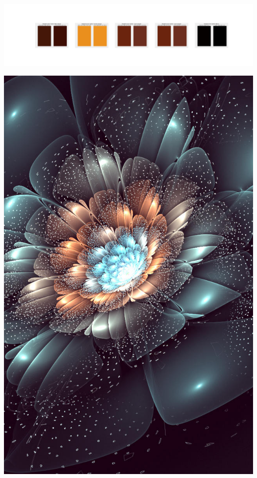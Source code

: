 \documentclass[11pt]{article}
\begin{document}
\begin{landscape}
    \begin{center}
    \includegraphics[width=250mm]{./nbimg/peak-427.jpg}
    \end{center}
    

    \begin{center}
    \includegraphics[width=\textwidth]{./nbimg/file (79).jpg}
    \end{center}


\end{landscape}
\end{document}
